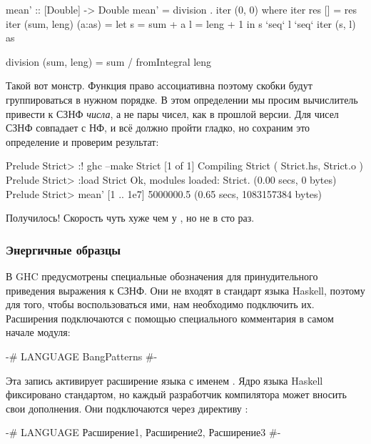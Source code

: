 \begin{code}
mean' :: [Double] -> Double
mean' = division . iter (0, 0)
    where iter res          []      = res
          iter (sum, leng)  (a:as)  = 
                let s = sum  + a
                    l = leng + 1
                in  s `seq` l `seq` iter (s, l) as
          
          division (sum, leng) = sum / fromIntegral leng
\end{code}

Такой вот монстр. Функция  право ассоциативна
поэтому скобки будут группироваться в нужном порядке.
В этом определении мы просим вычислитель привести
к СЗНФ \emph{числа}, а не пары чисел, как в прошлой версии.
Для чисел СЗНФ совпадает с НФ, и всё должно пройти гладко,
но сохраним это определение и проверим результат:

\begin{code}
Prelude Strict> :! ghc --make Strict
[1 of 1] Compiling Strict           ( Strict.hs, Strict.o )
Prelude Strict> :load Strict
Ok, modules loaded: Strict.
(0.00 secs, 0 bytes)
Prelude Strict> mean' [1 .. 1e7]
5000000.5
(0.65 secs, 1083157384 bytes)
\end{code}

Получилось! Скорость чуть хуже чем у , но не в сто раз.


\subsubsection{Энергичные образцы}

В GHC предусмотрены специальные обозначения для 
принудительного приведения выражения к СЗНФ. Они не входят
в стандарт языка Haskell, поэтому для того, чтобы
воспользоваться ими, нам необходимо подключить их. 
Расширения подключаются с помощью специального
комментария в самом начале модуля:

\begin{code}
{-# LANGUAGE BangPatterns #-}
\end{code}

Эта запись активирует расширение языка с именем .
Ядро языка Haskell фиксировано стандартом, но каждый разработчик
компилятора может вносить свои дополнения. Они подключаются 
через директиву :

\begin{code}
{-# LANGUAGE 
        Расширение1, 
        Расширение2, 
        Расширение3 #-}
\end{code}

